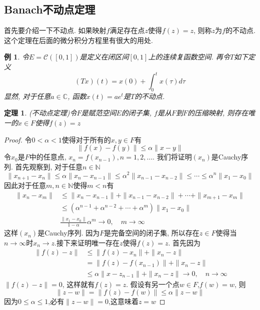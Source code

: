\documentclass{book}
\newtheorem{theorem}{\hspace{2em}定理}[section]
\newtheorem{proof}{证明}[section]
\newtheorem{example}{例}[section]
\begin{document}
\subsection*{Banach不动点定理}
首先要介绍一下不动点. 如果映射$f$满足存在点$z$使得$f(z)=z$, 则称$z$为$f$的不动点. 这个定理在后面的微分积分方程里有很大的用处.
\begin{example}
  令$E=\mathcal{C}([0,1])$是定义在闭区间$[0,1]$上的连续复函数空间. 再令$T$如下定义
  \begin{equation*}
    (Tx)(t)=x(0)+\int_{0}^{t}x(\tau)d\tau
  \end{equation*}
  显然, 对于任意$a\in \mathbb{C}$, 函数$x(t)=ae^t$是$T$的不动点.
\end{example}
\begin{theorem}
  (不动点定理)令$F$是赋范空间$E$的闭子集, $f$是从$F$到$F$的压缩映射, 则存在唯一的$x\in F$使得$f(z)=z$
\end{theorem}
\begin{proof}
  令$0<\alpha<1$使得对于所有的$x,y\in F$有
  \begin{equation*}
    \|f(x)-f(y)\|\leq\alpha\|x-y\|
  \end{equation*}
  令$x_0$是$F$中的任意点, $x_n=f(x_{n-1}),n=1,2,\dots$. 我们将证明$(x_n)$是Cauchy序列. 首先观察到, 对于任意$n\in \mathbb{N}$
  \begin{equation*}
    \|x_{n+1}-x_n\|\leq\alpha\|x_n-x_{n-1}\|\leq\alpha^2\|x_{n-1}-x_{n-2}\|\leq\cdots\leq\alpha^n\|x_1-x_0\|
  \end{equation*}
  因此对于任意$m,n\in\mathbb{N}$使得$m<n$有
  \begin{equation*}
  \begin{split}
     \|x_n-x_m\| & \leq\|x_n-x_{n-1}\|+\|x_{n-1}-x_{n-2}\|+\cdots+\|x_{m+1}-x_{m}\| \\
       & \leq(\alpha^{n-1}+\alpha^{n-2}+\cdots+\alpha^m)\|x_1-x_0\| \\
       & \frac{\|x_1-x_0\|}{1-\alpha}\alpha^m\to 0,\quad m\to\infty
  \end{split}
  \end{equation*}
  这样$(x_n)$是Cauchy序列. 因为$F$是完备空间的闭子集, 所以存在$z\in F$使得当$n\to\infty$时$x_n\to z$.接下来证明唯一存在$z$使得$f(z)=z$.
  首先因为
  \begin{equation*}\
  \begin{split}
     \|f(z)-z\|&\leq\|f(z)-x_n\|+\|x_n-z\| \\
       &=\|f(z)-f(x_{n-1})\|+\|x_n-z\| \\
       &\leq\alpha\|x-z_{n-1}\|+\|x_n-z\|\to 0,\quad n\to\infty
  \end{split}
  \end{equation*}
  $\|f(z)-z\|=0$, 这样就有$f(z)=z$. 假设有另一个点$w\in F$,$f(w)=w$, 则
  \begin{equation*}
    \|z-w\|=\|f(z)-f(w)\|\leq\alpha\|z-w\|
  \end{equation*}
  因为$0\leq\alpha\leq1$,必有$\|z-w\|=0$,这意味着$z=w$
\end{proof}
\end{document}
